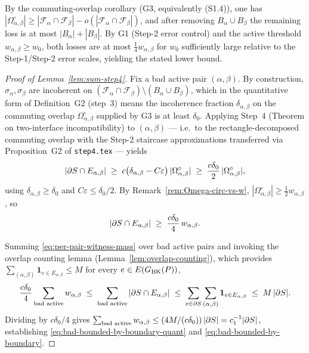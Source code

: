 \begin{remark}\label{rem:Omega-circ-vs-w}
By the commuting-overlap corollary (G3, equivalently (S1.4)), one has
$|\Omega^\circ_{\alpha,\beta}|\ge|\mathcal F_\alpha\cap\mathcal F_\beta|
-o(|\mathcal F_\alpha\cap\mathcal F_\beta|)$, and after removing
$B_\alpha\cup B_\beta$ the remaining loss is at most
$|B_\alpha|+|B_\beta|$.  By G1 (Step-2 error control) and the active
threshold $w_{\alpha,\beta}\ge w_0$, both losses are at most
$\tfrac14 w_{\alpha,\beta}$ for $w_0$ sufficiently large relative to
the Step-1/Step-2 error scales, yielding the stated lower bound.
\end{remark}

\begin{proof}[Proof of Lemma~\ref{lem:sum-step4}]
Fix a bad active pair $(\alpha,\beta)$.  By construction,
$\sigma_\alpha,\sigma_\beta$ are incoherent on
$(\mathcal F_\alpha\cap\mathcal F_\beta)\setminus(B_\alpha\cup B_\beta)$,
which in the quantitative form of Definition~G2 (step~3) means the
incoherence fraction $\delta_{\alpha,\beta}$ on the commuting overlap
$\Omega^\circ_{\alpha,\beta}$ supplied by G3 is at least $\delta_0$.
Applying Step~4 (Theorem on two-interface incompatibility) to
$(\alpha,\beta)$ — i.e.\ to the rectangle-decomposed commuting overlap
with the Step-2 staircase approximations transferred via Proposition~G2
of \texttt{step4.tex} — yields
\[
|\partial S\cap E_{\alpha,\beta}|
\;\ge\; c\bigl(\delta_{\alpha,\beta}-C\varepsilon\bigr)\,
|\Omega^\circ_{\alpha,\beta}|
\;\ge\; \frac{c\delta_0}{2}\,|\Omega^\circ_{\alpha,\beta}|,
\]
using $\delta_{\alpha,\beta}\ge\delta_0$ and
$C\varepsilon\le\delta_0/2$.  By Remark~\ref{rem:Omega-circ-vs-w},
$|\Omega^\circ_{\alpha,\beta}|\ge\tfrac12 w_{\alpha,\beta}$, so
\begin{equation}\label{eq:per-pair-witness-mass}
|\partial S\cap E_{\alpha,\beta}|
\;\ge\; \frac{c\delta_0}{4}\, w_{\alpha,\beta}.
\end{equation}

Summing \eqref{eq:per-pair-witness-mass} over bad active pairs and
invoking the overlap counting lemma
(Lemma~\ref{lem:overlap-counting}), which provides
$\sum_{(\alpha,\beta)}\mathbf{1}_{e\in E_{\alpha,\beta}}\le M$ for every
$e\in E(G_{\mathrm{BK}}(P))$,
\[
\frac{c\delta_0}{4}
\sum_{\text{bad active}} w_{\alpha,\beta}
\;\le\;\sum_{\text{bad active}} |\partial S\cap E_{\alpha,\beta}|
\;\le\;\sum_{e\in\partial S}\sum_{(\alpha,\beta)}
\mathbf{1}_{e\in E_{\alpha,\beta}}
\;\le\; M\,|\partial S|.
\]
Dividing by $c\delta_0/4$ gives
$\sum_{\text{bad active}} w_{\alpha,\beta}\le (4M/(c\delta_0))\,|\partial S|
= c_1^{-1}|\partial S|$, establishing
\eqref{eq:bad-bounded-by-boundary-quant} and
\eqref{eq:bad-bounded-by-boundary}.
\end{proof}

